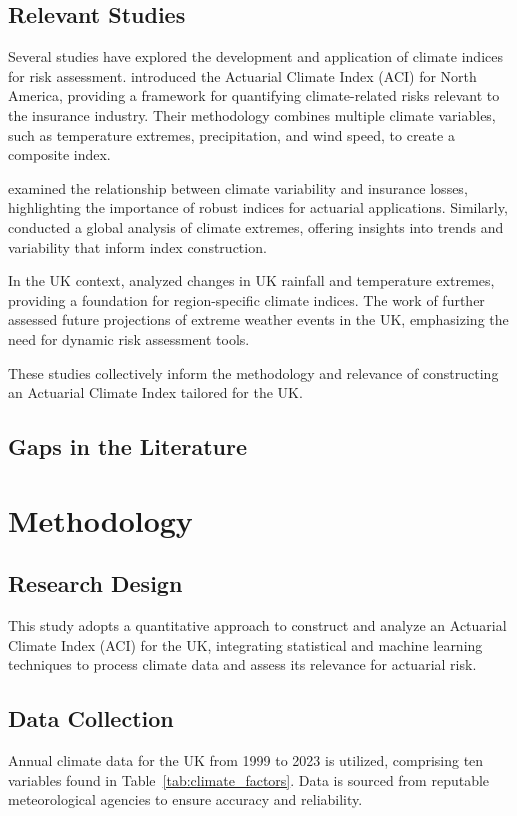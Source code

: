 \documentclass[12pt,a4paper]{report}
\begin{document}
\section{Relevant Studies}
Several studies have explored the development and application of climate indices for risk assessment. \citet{brooks2014actuarial} introduced the Actuarial Climate Index (ACI) for North America, providing a framework for quantifying climate-related risks relevant to the insurance industry. Their methodology combines multiple climate variables, such as temperature extremes, precipitation, and wind speed, to create a composite index.

\citet{zwiers2011climate} examined the relationship between climate variability and insurance losses, highlighting the importance of robust indices for actuarial applications. Similarly, \citet{alexander2006global} conducted a global analysis of climate extremes, offering insights into trends and variability that inform index construction.

In the UK context, \citet{kendon2014uk} analyzed changes in UK rainfall and temperature extremes, providing a foundation for region-specific climate indices. The work of \citet{palin2016future} further assessed future projections of extreme weather events in the UK, emphasizing the need for dynamic risk assessment tools.

These studies collectively inform the methodology and relevance of constructing an Actuarial Climate Index tailored for the UK.
\section{Gaps in the Literature}

\chapter{Methodology}

\section{Research Design}
This study adopts a quantitative approach to construct and analyze an Actuarial Climate Index (ACI) for the UK, integrating statistical and machine learning techniques to process climate data and assess its relevance for actuarial risk.

\section{Data Collection}
Annual climate data for the UK from 1999 to 2023 is utilized, comprising ten variables found in Table~\ref{tab:climate_factors}. Data is sourced from reputable meteorological agencies to ensure accuracy and reliability.
\end{document}
